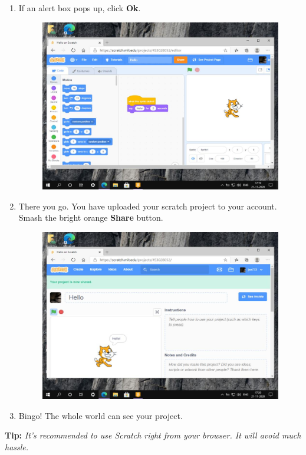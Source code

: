 \documentclass[a4paper]{article}
\begin{document}
\begin{enumerate}
    \item If an alert box pops up, click \textbf{Ok}.

          \begin{figure}[H]
              \centering
              \includegraphics[width = .8\linewidth]{17}
          \end{figure}

    \item There you go. You have uploaded your scratch project to your account. Smash the bright orange \textbf{Share} button.

          \begin{figure}[H]
              \centering
              \includegraphics[width = .8\linewidth]{18}
          \end{figure}

    \item Bingo! The whole world can see your project.
\end{enumerate}
\vspace{1cm}
\begin{center}
    \textbf{Tip:} \textit{It's recommended to use Scratch right from your browser. It will avoid much hassle.}
\end{center}
\end{document}
